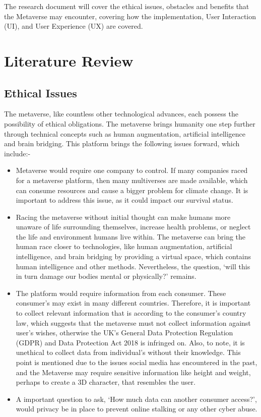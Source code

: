 \documentclass[conference]{IEEEtran}
\begin{document}
      The research document will cover the ethical issues, obstacles and benefits that the Metaverse may encounter, covering how the implementation, User Interaction (UI), and User Experience (UX) are covered.
    \section{Literature Review}
      \subsection{Ethical Issues}
      The metaverse, like countless other technological advances, each possess the possibility of ethical obligations. The metaverse brings humanity one step further through technical concepts such as human augmentation, artificial intelligence and brain bridging. This platform brings the following issues forward, which include:-
      \begin{itemize}
        \item Metaverse would require one company to control. If many companies raced for a metaverse platform, then many multiverses are made available, which can consume resources and cause a bigger problem for climate change. It is important to address this issue, as it could impact our survival status.
        \item Racing the metaverse without initial thought can make humans more unaware of life surrounding themselves, increase health problems, or neglect the life and environment humans live within. The metaverse can bring the human race closer to technologies, like human augmentation, artificial intelligence, and brain bridging by providing a virtual space, which contains human intelligence and other methods. Nevertheless, the question, `will this in turn damage our bodies mental or physically?' remains.
        \item The platform would require information from each consumer. These consumer's may exist in many different countries. Therefore, it is important to collect relevant information that is according to the consumer's country law, which suggests that the metaverse must not collect information against user's wishes, otherwise the UK's General Data Protection Regulation (GDPR) and Data Protection Act 2018 is infringed on. Also, to note, it is unethical to collect data from individual's without their knowledge. This point is mentioned due to the issues social media has encountered in the past, and the Metaverse may require sensitive information like height and weight, perhaps to create a 3D character, that resembles the user.
        \item A important question to ask, `How much data can another consumer access?', would privacy be in place to prevent online stalking or any other cyber abuse.
      \end{itemize}
\end{document}
